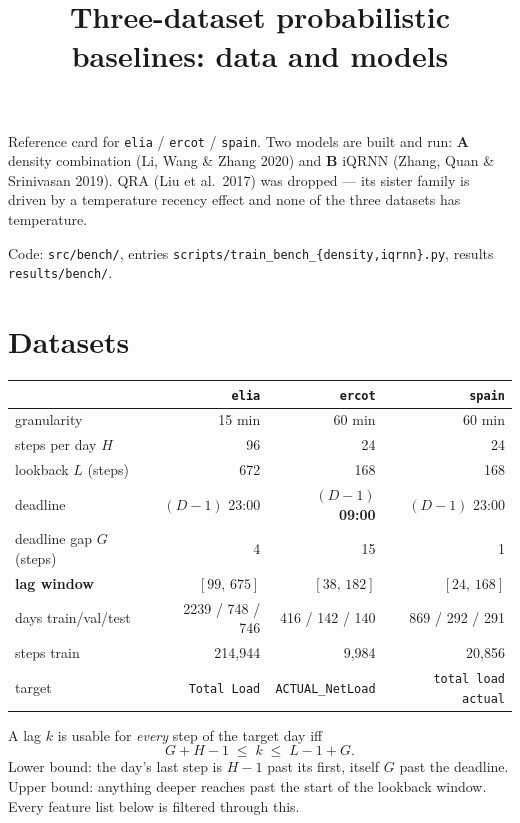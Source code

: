 \documentclass[11pt,a4paper]{article}
\title{Three-dataset probabilistic baselines: data and models}
\author{}
\date{}
\begin{document}
\maketitle
\vspace{-3em}

\noindent
Reference card for \texttt{elia} / \texttt{ercot} / \texttt{spain}. Two models are built and
run: \textbf{A} density combination (Li, Wang \& Zhang 2020) and \textbf{B} iQRNN (Zhang, Quan
\& Srinivasan 2019). QRA (Liu et al.\ 2017) was dropped --- its sister family is driven by a
temperature recency effect and none of the three datasets has temperature.

Code: \texttt{src/bench/}, entries \texttt{scripts/train\_bench\_\{density,iqrnn\}.py},
results \texttt{results/bench/}.

\section{Datasets}

\begin{center}
\small
\begin{tabular}{@{}l r r r@{}}
\toprule
 & \texttt{elia} & \texttt{ercot} & \texttt{spain} \\
\midrule
granularity                & 15 min & 60 min & 60 min \\
steps per day $H$          & 96 & 24 & 24 \\
lookback $L$ (steps)       & 672 & 168 & 168 \\
deadline                   & $(D{-}1)$ 23:00 & $(D{-}1)$ \textbf{09:00} & $(D{-}1)$ 23:00 \\
deadline gap $G$ (steps)   & 4 & 15 & 1 \\
\textbf{lag window}        & $[99,\,675]$ & $[38,\,182]$ & $[24,\,168]$ \\
days train/val/test        & 2239 / 748 / 746 & 416 / 142 / 140 & 869 / 292 / 291 \\
steps train                & 214{,}944 & 9{,}984 & 20{,}856 \\
target                     & \texttt{Total Load} & \texttt{ACTUAL\_NetLoad} & \texttt{total load actual} \\
\bottomrule
\end{tabular}
\end{center}

\noindent
A lag $k$ is usable for \emph{every} step of the target day iff
\begin{equation}
  G + H - 1 \;\leq\; k \;\leq\; L - 1 + G .
  \label{eq:window}
\end{equation}
Lower bound: the day's last step is $H{-}1$ past its first, itself $G$ past the deadline.
Upper bound: anything deeper reaches past the start of the lookback window. Every feature list
below is filtered through this.
\end{document}

